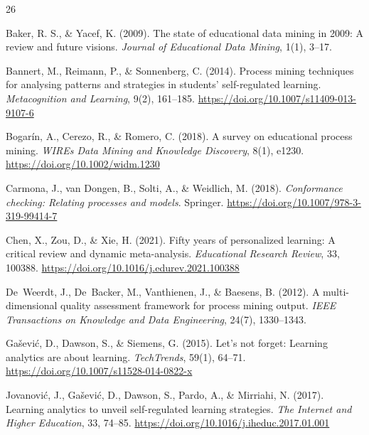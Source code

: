 \renewcommand{\refname}{Tài liệu tham khảo}

\begin{thebibliography}{26}

Baker, R. S., \& Yacef, K. (2009). The state of educational data mining in 2009: A review and future visions. \textit{Journal of Educational Data Mining}, 1(1), 3--17.

Bannert, M., Reimann, P., \& Sonnenberg, C. (2014). Process mining techniques for analysing patterns and strategies in students' self-regulated learning. \textit{Metacognition and Learning}, 9(2), 161--185. \url{https://doi.org/10.1007/s11409-013-9107-6}

Bogar{\'i}n, A., Cerezo, R., \& Romero, C. (2018). A survey on educational process mining. \textit{WIREs Data Mining and Knowledge Discovery}, 8(1), e1230. \url{https://doi.org/10.1002/widm.1230}

Carmona, J., van Dongen, B., Solti, A., \& Weidlich, M. (2018). \textit{Conformance checking: Relating processes and models}. Springer. \url{https://doi.org/10.1007/978-3-319-99414-7}

Chen, X., Zou, D., \& Xie, H. (2021). Fifty years of personalized learning: A critical review and dynamic meta-analysis. \textit{Educational Research Review}, 33, 100388. \url{https://doi.org/10.1016/j.edurev.2021.100388}

De~Weerdt, J., De~Backer, M., Vanthienen, J., \& Baesens, B. (2012). A multi-dimensional quality assessment framework for process mining output. \textit{IEEE Transactions on Knowledge and Data Engineering}, 24(7), 1330--1343.

Ga{\v{s}}evi{\'c}, D., Dawson, S., \& Siemens, G. (2015). Let's not forget: Learning analytics are about learning. \textit{TechTrends}, 59(1), 64--71. \url{https://doi.org/10.1007/s11528-014-0822-x}

Jovanovi{\'c}, J., Ga{\v{s}}evi{\'c}, D., Dawson, S., Pardo, A., \& Mirriahi, N. (2017). Learning analytics to unveil self-regulated learning strategies. \textit{The Internet and Higher Education}, 33, 74--85. \url{https://doi.org/10.1016/j.iheduc.2017.01.001}


\end{thebibliography}
